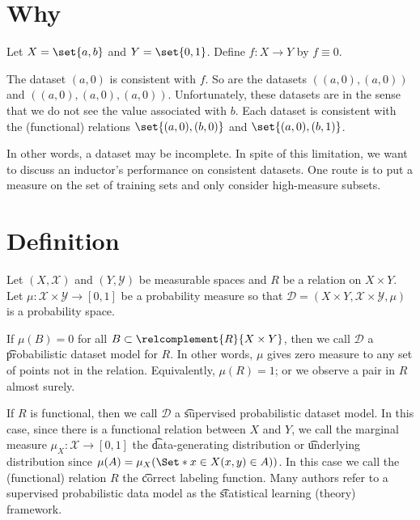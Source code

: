 

\section*{Why}

Let $X = \set{a, b}$ and $Y = \set{0, 1}$. Define $f: X \to Y$ by $f \equiv 0$.

The dataset $(a, 0)$ is consistent with $f$.
So are the datasets $((a, 0), (a, 0))$ and $((a, 0), (a, 0), (a, 0))$.
Unfortunately, these datasets are  in the sense that we do not see the value associated with $b$.
Each dataset is consistent with the (functional) relations $\set{(a, 0), (b, 0)}$ and $\set{(a, 0), (b, 1)}$.

In other words, a dataset may be incomplete.
In spite of this limitation, we want to discuss an inductor's performance on consistent datasets.
One route is to put a measure on the set of training sets and only consider high-measure subsets.


\section*{Definition}

Let $(X, \mathcal{X} )$ and $(Y, \mathcal{Y} )$ be measurable spaces and $R$ be a relation on $X \times  Y$.
Let $\mu : \mathcal{X}  \times  \mathcal{Y}  \to [0, 1]$ be a probability measure so that $\mathcal{D}  = (X \times  Y, \mathcal{X}  \times  \mathcal{Y} , \mu )$ is a probability space.

If $\mu (B) = 0$ for all $B \subset \relcomplement{R}{X \times Y}$, then we call $\mathcal{D} $ a \t{probabilistic dataset model} for $R$.
In other words, $\mu $ gives zero measure to any set of points not in the relation.
Equivalently, $\mu (R) = 1$; or we observe a pair in $R$ almost surely.

If $R$ is functional, then we call $\mathcal{D} $ a \t{supervised probabilistic dataset model}.
In this case, since there is a functional relation between $X$ and $Y$, we call the marginal measure $\mu _X: \mathcal{X}  \to [0, 1]$ the \t{data-generating distribution} or \t{underlying distribution} since $\mu (A) = \mu _X(\Set*{x \in X}{(x, y) \in A)})$.
In this case we call the (functional) relation $R$ the \t{correct labeling function}.
Many authors refer to a supervised probabilistic data model as the \t{statistical learning (theory) framework}.

